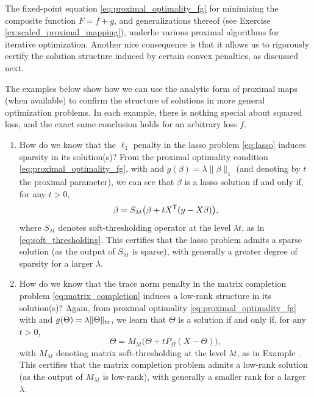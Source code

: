 The fixed-point equation \eqref{eq:proximal_optimality_fg} for minimizing the
composite function $F = f+g$, and generalizations thereof (see Exercise
\ref{ex:scaled_proximal_mapping}), underlie various proximal algorithms for    
iterative optimization. Another nice consequence is that it allows us to
rigorously certify the solution structure induced by certain convex penalties,
as discussed next.    

\begin{Example}
\label{xa:proximal_optimality}
The examples below show how we can use the analytic form of proximal maps (when
available) to confirm the structure of solutions in more general optimization
problems. In each example, there is nothing special about squared loss, and the
exact same conclusion holds for an arbitrary loss $f$.   

\begin{enumerate}[label=\alph*., ref=\alph*]
\item How do we know that the $\ell_1$ penalty in the lasso problem
  \eqref{eq:lasso} induces sparsity in its solution(s)? From the proximal
  optimality condition \eqref{eq:proximal_optimality_fg}, with  and $g(\beta) = \lambda \|\beta\|_1$
  (and denoting by $t$ the proximal parameter), we can see that $\beta$ is a
  lasso solution if and only if, for any $t>0$,   
  \[
  \beta = S_{\lambda t} \big( \beta + t X^{\mathsf{T}} (y - X\beta) \big),
  \]
  where $S_{\lambda t}$ denotes soft-thresholding operator at the level
  $\lambda t$, as in \eqref{eq:soft_thresholding}. This certifies that the lasso
  problem admits a sparse solution (as the output of $S_{\lambda t}$ is sparse),
  with generally a greater degree of sparsity for a larger $\lambda$.     

\item How do we know that the trace norm penalty in the matrix completion
  problem \eqref{eq:matrix_completion} induces a low-rank structure in its
  solution(s)? Again, from proximal optimality \eqref{eq:proximal_optimality_fg}
  with  and
  $g(\Theta) = \lambda \|\Theta\|_{\operatorname{tr}}$, we learn that $\Theta$ is a solution
  if and only if, for any $t>0$, 
  \[
  \Theta = M_{\lambda t} \big( \Theta + t P_\Omega (X - \Theta) \big),
  \]
  with $M_{\lambda t}$ denoting matrix soft-thresholding at the level $\lambda
  t$, as in Example . This certifies that
  the matrix completion problem admits a low-rank solution (as the output of
  $M_{\lambda  t}$ is low-rank), with generally a smaller rank for a larger
  $\lambda$.      
\end{enumerate}
\end{Example}

